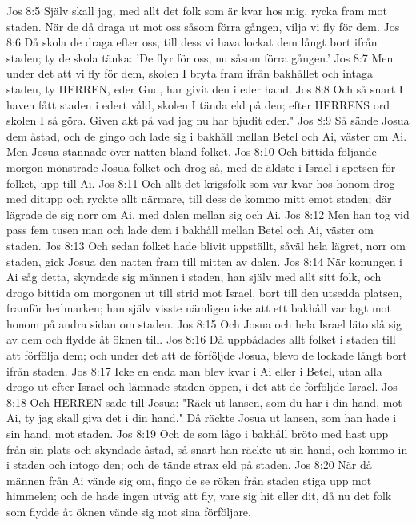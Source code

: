 Jos 8:5  Själv skall jag, med allt det folk som är kvar hos mig, rycka fram mot staden. När de då draga ut mot oss såsom förra gången, vilja vi fly för dem.
Jos 8:6  Då skola de draga efter oss, till dess vi hava lockat dem långt bort ifrån staden; ty de skola tänka: 'De flyr för oss, nu såsom förra gången.'
Jos 8:7  Men under det att vi fly för dem, skolen I bryta fram ifrån bakhållet och intaga staden, ty HERREN, eder Gud, har givit den i eder hand.
Jos 8:8  Och så snart I haven fått staden i edert våld, skolen I tända eld på den; efter HERRENS ord skolen I så göra. Given akt på vad jag nu har bjudit eder."
Jos 8:9  Så sände Josua dem åstad, och de gingo och lade sig i bakhåll mellan Betel och Ai, väster om Ai. Men Josua stannade över natten bland folket.
Jos 8:10  Och bittida följande morgon mönstrade Josua folket och drog så, med de äldste i Israel i spetsen för folket, upp till Ai.
Jos 8:11  Och allt det krigsfolk som var kvar hos honom drog med ditupp och ryckte allt närmare, till dess de kommo mitt emot staden; där lägrade de sig norr om Ai, med dalen mellan sig och Ai.
Jos 8:12  Men han tog vid pass fem tusen man och lade dem i bakhåll mellan Betel och Ai, väster om staden.
Jos 8:13  Och sedan folket hade blivit uppställt, såväl hela lägret, norr om staden, gick Josua den natten fram till mitten av dalen.
Jos 8:14  När konungen i Ai såg detta, skyndade sig männen i staden, han själv med allt sitt folk, och drogo bittida om morgonen ut till strid mot Israel, bort till den utsedda platsen, framför hedmarken; han själv visste nämligen icke att ett bakhåll var lagt mot honom på andra sidan om staden.
Jos 8:15  Och Josua och hela Israel läto slå sig av dem och flydde åt öknen till.
Jos 8:16  Då uppbådades allt folket i staden till att förfölja dem; och under det att de förföljde Josua, blevo de lockade långt bort ifrån staden.
Jos 8:17  Icke en enda man blev kvar i Ai eller i Betel, utan alla drogo ut efter Israel och lämnade staden öppen, i det att de förföljde Israel.
Jos 8:18  Och HERREN sade till Josua: "Räck ut lansen, som du har i din hand, mot Ai, ty jag skall giva det i din hand." Då räckte Josua ut lansen, som han hade i sin hand, mot staden.
Jos 8:19  Och de som lågo i bakhåll bröto med hast upp från sin plats och skyndade åstad, så snart han räckte ut sin hand, och kommo in i staden och intogo den; och de tände strax eld på staden.
Jos 8:20  När då männen från Ai vände sig om, fingo de se röken från staden stiga upp mot himmelen; och de hade ingen utväg att fly, vare sig hit eller dit, då nu det folk som flydde åt öknen vände sig mot sina förföljare.
